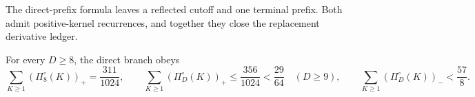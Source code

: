 The direct-prefix formula leaves a reflected cutoff and one terminal prefix.
Both admit positive-kernel recurrences, and together they close the replacement
derivative ledger.

\begin{lemma}
\label{lem:terminal-modal-static-direct-lobes-D8}
For every $D\ge8$, the direct branch obeys
\begin{equation}
 \sum_{K\ge1}(\Pi_8^\circ(K))_+=\frac{311}{1024},
 \qquad
 \sum_{K\ge1}(\Pi_D^\circ(K))_+
 \le\frac{356}{1024}<\frac{29}{64}\quad(D\ge9),
 \qquad
 \sum_{K\ge1}(\Pi_D^\circ(K))_-<\frac{57}{8}.
 \label{eq:terminal-modal-static-direct-lobes-D8}
\end{equation}
\end{lemma}

